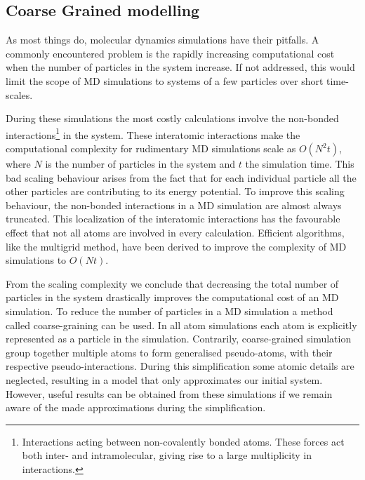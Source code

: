 \subsection{Coarse Grained modelling}
As most things do, molecular dynamics simulations have their pitfalls. A commonly
encountered problem is the rapidly increasing computational cost when the number of
particles in the system increase. If not addressed, this would limit the scope of MD
simulations to systems of a few particles over short time-scales.

During these simulations the most costly calculations involve the non-bonded
interactions\footnote{Interactions acting between non-covalently bonded atoms. These
forces act both inter- and intramolecular, giving rise to a large multiplicity in
interactions.} in the system. These interatomic interactions make the computational
complexity for rudimentary MD simulations scale as $O(N^2t)$, where $N$ is the number of
particles in the system and $t$ the simulation time. This bad scaling behaviour arises
from the fact that for each individual particle all the other particles are
contributing to its energy potential. To improve this scaling behaviour, the non-bonded
interactions in a MD simulation are almost always truncated. This localization of the
interatomic interactions has the favourable effect that not all atoms are involved in
every calculation. Efficient algorithms, like the multigrid method, have been derived
to improve the complexity of MD simulations to $O(Nt)$.\cite{Celeste2001}

From the scaling complexity we conclude that decreasing the total number of particles in
the system drastically improves the computational cost of an MD simulation. To reduce the
number of particles in a MD simulation a method called coarse-graining can be used.
In all atom simulations each atom is explicitly represented as a particle in the
simulation. Contrarily, coarse-grained simulation group together multiple atoms to form
generalised pseudo-atoms, with their respective pseudo-interactions. During this
simplification some atomic details are neglected, resulting in a model that only
approximates our initial system. However, useful results can be obtained from
these simulations if we remain aware of the made approximations during the
simplification.


